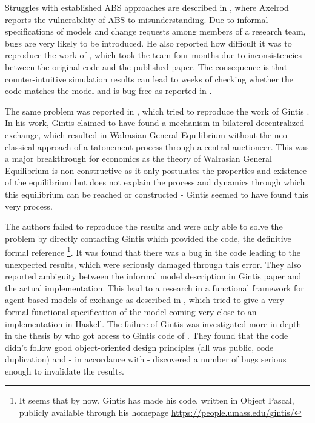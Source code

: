 \medskip

Struggles with established ABS approaches are described in \cite{axelrod_chapter_2006}, where Axelrod reports the vulnerability of ABS to misunderstanding. Due to informal specifications of models and change requests among members of a research team, bugs are very likely to be introduced. He also reported how difficult it was to reproduce the work of \cite{axelrod_convergence_1995}, which took the team four months due to inconsistencies between the original code and the published paper. The consequence is that counter-intuitive simulation results can lead to weeks of checking whether the code matches the model and is bug-free as reported in \cite{axelrod_advancing_1997}.

The same problem was reported in \cite{ionescu_dependently-typed_2012}, which tried to reproduce the work of Gintis \cite{gintis_emergence_2006}. In his work, Gintis claimed to have found a mechanism in bilateral decentralized exchange, which resulted in Walrasian General Equilibrium without the neo-classical approach of a tatonement process through a central auctioneer. This was a major breakthrough for economics as the theory of Walrasian General Equilibrium is non-constructive as it only postulates the properties and existence of the equilibrium \cite{colell_microeconomic_1995} but does not explain the process and dynamics through which this equilibrium can be reached or constructed - Gintis seemed to have found this very process.

The authors \cite{ionescu_dependently-typed_2012} failed to reproduce the results and were only able to solve the problem by directly contacting Gintis which provided the code, the definitive formal reference \footnote{It seems that by now, Gintis has made his code, written in Object Pascal, publicly available through his homepage \url{https://people.umass.edu/gintis/}}. It was found that there was a bug in the code leading to the unexpected results, which were seriously damaged through this error. They also reported ambiguity between the informal model description in Gintis paper and the actual implementation.
This lead to a research in a functional framework for agent-based models of exchange as described in \cite{botta_functional_2011}, which tried to give a very formal functional specification of the model coming very close to an implementation in Haskell. The failure of Gintis was investigated more in depth in the thesis by \cite{evensen_extensible_2010} who got access to Gintis code of \cite{gintis_emergence_2006}. They found that the code didn't follow good object-oriented design principles (all was public, code duplication) and - in accordance with \cite{ionescu_dependently-typed_2012} - discovered a number of bugs serious enough to invalidate the results. 

